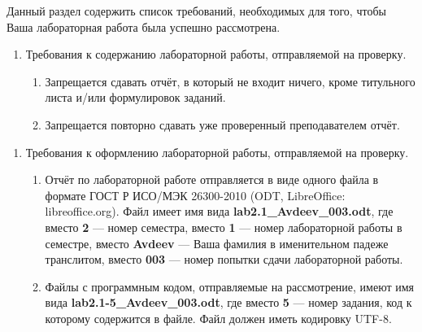 Данный раздел содержить список требований, необходимых для того, чтобы Ваша лабораторная работа была успешно рассмотрена.

\begin{enumerate}
	\item
		Требования к содержанию лабораторной работы, отправляемой на проверку.
	\begin{enumerate}
		\item
			Запрещается сдавать отчёт, в который не входит ничего, кроме титульного листа и/или формулировок заданий.
		\item
			Запрещается повторно сдавать уже проверенный преподавателем отчёт.			
	\end{enumerate}		

\end{enumerate}

\begin{enumerate}
	\item
		Требования к оформлению лабораторной работы, отправляемой на проверку.
	\begin{enumerate}
		\item
			Отчёт по лабораторной работе отправляется в виде одного файла в формате ГОСТ Р ИСО/МЭК 26300-2010 (ODT, LibreOffice: libreoffice.org).
			Файл имеет имя вида \textbf{lab2.1\_Avdeev\_003.odt},
			где вместо \textbf{2} --- номер семестра, вместо \textbf{1} --- номер лабораторной работы в семестре,
			вместо \textbf{Avdeev} --- Ваша фамилия в именительном падеже транслитом,
			вместо \textbf{003} --- номер попытки сдачи лабораторной работы.
		\item
			Файлы с программным кодом, отправляемые на рассмотрение, имеют имя вида \textbf{lab2.1-5\_Avdeev\_003.odt},
			где вместо \textbf{5} --- номер задания, код к которому содержится в файле.
			Файл должен иметь кодировку UTF-8.
	\end{enumerate}		

\end{enumerate}


